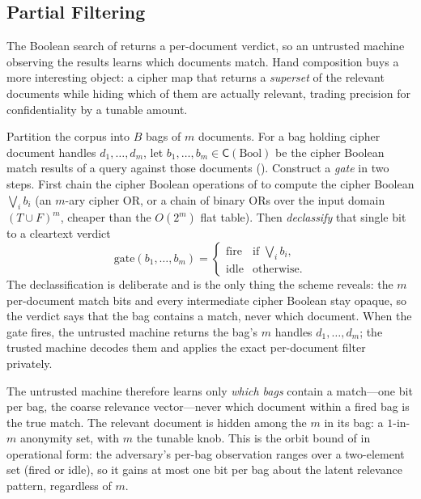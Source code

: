 \documentclass[11pt]{article}
\theoremstyle{definition}
\theoremstyle{plain}
\theoremstyle{remark}
\newcommand{\cipher}[1]{\mathsf{C}(#1)}
\begin{document}
\subsection{Partial Filtering}
\label{sec:partial-filter}

The Boolean search of  returns a per-document
verdict, so an untrusted machine observing the results learns which
documents match.
Hand composition buys a more interesting object: a cipher map that
returns a \emph{superset} of the relevant documents while hiding which
of them are actually relevant, trading precision for confidentiality by
a tunable amount.

Partition the corpus into $B$ bags of $m$ documents.
For a bag holding cipher document handles $d_1, \ldots, d_m$, let
$b_1, \ldots, b_m \in \cipher{\mathrm{Bool}}$ be the cipher Boolean
match results of a query against those documents
().
Construct a \emph{gate} in two steps.
First chain the cipher Boolean operations of  to
compute the cipher Boolean $\bigvee_i b_i$ (an $m$-ary cipher OR, or a
chain of binary ORs over the input domain $(T\cup F)^m$, cheaper than
the $O(2^m)$ flat table).
Then \emph{declassify} that single bit to a cleartext verdict
\[
\mathrm{gate}(b_1,\dots,b_m) =
\begin{cases}
\text{fire} & \text{if } \textstyle\bigvee_i b_i,\\
\text{idle} & \text{otherwise.}
\end{cases}
\]
The declassification is deliberate and is the only thing the scheme
reveals: the $m$ per-document match bits and every intermediate cipher
Boolean stay opaque, so the verdict says that the bag contains a match,
never which document.
When the gate fires, the untrusted machine returns the bag's $m$ handles
$d_1, \dots, d_m$; the trusted machine decodes them and applies the
exact per-document filter privately.

The untrusted machine therefore learns only \emph{which bags} contain a
match---one bit per bag, the coarse relevance vector---never which
document within a fired bag is the true match.
The relevant document is hidden among the $m$ in its bag: a $1$-in-$m$
anonymity set, with $m$ the tunable knob.
This is the orbit bound of  in
operational form: the adversary's per-bag observation ranges over a
two-element set (fired or idle), so it gains at most one bit per bag
about the latent relevance pattern, regardless of $m$.
\end{document}
